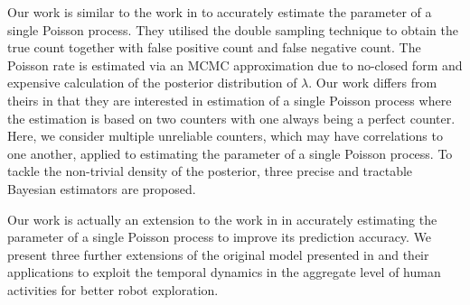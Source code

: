 Our work is similar to the work in \cite{bratcher2002} to accurately estimate the parameter of a single Poisson process. They utilised the double sampling technique to obtain the true count together with false positive count and false negative count. The Poisson rate is estimated via an MCMC approximation due to no-closed form and expensive calculation of the posterior distribution of $\lambda$. Our work differs from theirs in that they are interested in estimation of a single Poisson process where the estimation is based on two counters with one always being a perfect counter. Here, we consider multiple unreliable counters, which may have correlations to one another, applied to estimating the parameter of a single Poisson process. To tackle the non-trivial density of the posterior, three precise and tractable Bayesian estimators are proposed. 

Our work is actually an extension to the work in \cite{jovan18a} in accurately estimating the parameter of a single Poisson process to improve its prediction accuracy. We present three further extensions of the original model presented in \cite{jovan18a} and their applications to exploit the temporal dynamics in the aggregate level of human activities for better robot exploration.


